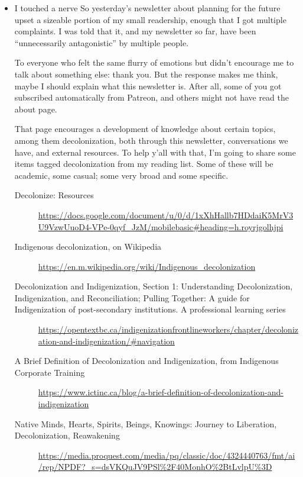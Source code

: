 \documentclass[11pt]{article}
\begin{document}
\begin{itemize}
\item I touched a nerve
\label{sec:org5f4c8b3}
So yesterday’s newsletter about planning for the future upset a sizeable portion of my small readership, enough that I got multiple complaints. I was told that it, and my newsletter so far, have been “unnecessarily antagonistic” by multiple people.

To everyone who felt the same flurry of emotions but didn’t encourage me to talk about something else: thank you. But the response makes me think, maybe I should explain what this newsletter is. After all, some of you got subscribed automatically from Patreon, and others might not have read the about page.

That page encourages a development of knowledge about certain topics, among them decolonization, both through this newsletter, conversations we have, and external resources. To help y’all with that, I’m going to share some items tagged decolonization from my reading list. Some of these will be academic, some casual; some very broad and some specific.

\begin{description}
\item[{Decolonize: Resources}] \url{https://docs.google.com/document/u/0/d/1xXhHallb7HDdaiK5MrV3U9VzwUuoD4-VPe-0qyf\_JzM/mobilebasic\#heading=h.royrjgolhjpi}

\item[{Indigenous decolonization, on Wikipedia}] \url{https://en.m.wikipedia.org/wiki/Indigenous\_decolonization}

\item[{Decolonization and Indigenization, Section 1: Understanding Decolonization, Indigenization, and Reconciliation; Pulling Together: A guide for Indigenization of post-secondary institutions. A professional learning series}] \url{https://opentextbc.ca/indigenizationfrontlineworkers/chapter/decolonization-and-indigenization/\#navigation}

\item[{A Brief Definition of Decolonization and Indigenization, from Indigenous Corporate Training}] \url{https://www.ictinc.ca/blog/a-brief-definition-of-decolonization-and-indigenization}

\item[{Native Minds, Hearts, Spirits, Beings, Knowings: Journey to Liberation, Decolonization, Reawakening}] \url{https://media.proquest.com/media/pq/classic/doc/4324440763/fmt/ai/rep/NPDF?\_s=dsVKQuJV9PSl\%2F40MonhO\%2BtLvlpU\%3D}


\end{description}
\end{itemize}
\end{document}

